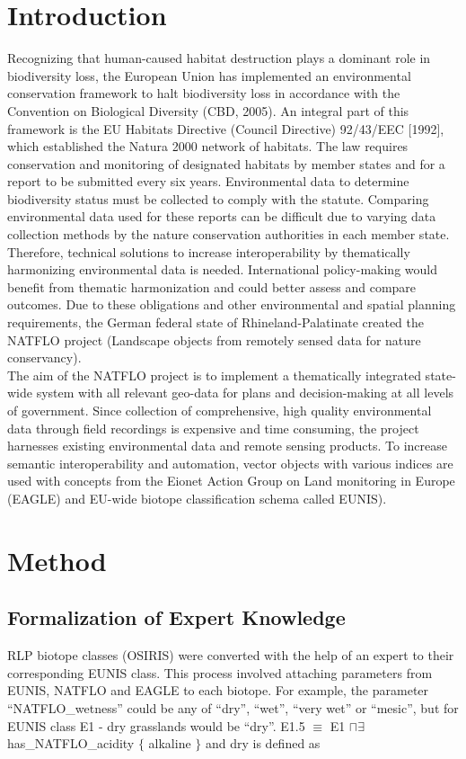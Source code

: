 \documentclass[authoryear, review,12pt,number]{elsarticle}
\begin{document}
\section{Introduction} 
Recognizing that human-caused habitat destruction plays a dominant role in
biodiversity loss, the European Union has implemented an environmental
conservation framework to halt biodiversity loss in accordance with the
Convention on Biological Diversity (CBD, 2005). An integral part of this
framework is the EU Habitats Directive (Council Directive) 92/43/EEC [1992],
which established the Natura 2000 network of habitats. The law requires
conservation and monitoring of designated habitats by member states and for a
report to be submitted every six years. Environmental data 
to determine biodiversity status must be collected to comply with the 
statute. Comparing environmental data used for these reports can be 
difficult due to varying data collection methods by the 
nature conservation authorities in each member state. Therefore, technical 
solutions to increase interoperability by thematically harmonizing 
environmental data is needed. International policy-making would benefit from 
thematic harmonization and could better assess and compare outcomes. Due to 
these obligations and other environmental and spatial planning requirements, 
the German federal state of
Rhineland-Palatinate created the NATFLO project (Landscape objects from remotely
sensed data for nature conservancy).\\
The aim of the NATFLO project is to implement a
thematically integrated state-wide system with all relevant geo-data for plans
and decision-making at all levels of government.  Since collection of
comprehensive, high quality environmental data through field recordings is
expensive and time consuming, the project harnesses existing environmental data
and remote sensing products. To increase semantic interoperability and
automation, vector objects with various indices are used with concepts from the
Eionet Action Group on Land monitoring in Europe (EAGLE) and EU-wide 
biotope classification schema called EUNIS). 
\section{Method}

\subsection{Formalization of Expert Knowledge}
RLP biotope classes (OSIRIS) were converted with the help of an expert to their 
corresponding EUNIS class. This process involved attaching parameters from 
EUNIS, NATFLO and EAGLE to each biotope. For example, the parameter 
``NATFLO\_wetness'' could be any of ``dry'', ``wet'', ``very wet'' or 
``mesic'', but for EUNIS class E1 - dry grasslands would be ``dry''.
E1.5 $\equiv $ E1 $\sqcap \exists $ has\_NATFLO\_acidity $\{$ alkaline $\}$ 
and dry is defined as  
\end{document}
